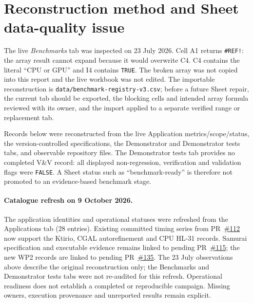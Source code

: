 \section{Reconstruction method and Sheet data-quality issue}
The live \emph{Benchmarks} tab was inspected on 23 July 2026.  Cell A1 returns
\texttt{\#REF!}: the array result cannot expand because it would overwrite C4.
C4 contains the literal ``CPU or GPU'' and I4 contains \texttt{TRUE}.  The broken
array was not copied into this report and the live workbook was not edited.  The
importable reconstruction is \texttt{data/benchmark-registry-v3.csv}; before a
future Sheet repair, the current tab should be exported, the blocking cells and
intended array formula reviewed with its owner, and the import applied to a
separate verified range or replacement tab.

Records below were reconstructed from the live Application metrics/scope/status,
the version-controlled specifications, the Demonstrator and Demonstrator tests
tabs, and observable repository files.  The Demonstrator tests tab provides no
completed V\&V record: all displayed non-regression, verification and validation
flags were \texttt{FALSE}.  A Sheet status such as ``benchmark-ready'' is
therefore not promoted to an evidence-based benchmark stage.

\paragraph{Catalogue refresh on 9 October 2026.}
The application identities and operational statuses were refreshed from the
Applications tab (28 entries). Existing committed timing series from PR~\href{https://github.com/numpex/exa-ma-d7.1/pull/112}{\#112}
now support the Ktirio, CGAL autorefinement and CPU HL-31 records.
Samurai specification and executable evidence remains linked to pending PR~\href{https://github.com/numpex/exa-ma-d7.1/pull/115}{\#115};
the new WP2 records are linked to pending PR~\href{https://github.com/numpex/exa-ma-d7.1/pull/135}{\#135}.
The 23 July observations above describe the original reconstruction only;
the Benchmarks and Demonstrator tests tabs were not re-audited for this refresh.
Operational readiness does not establish a completed or reproducible campaign.
Missing owners, execution provenance and unreported results remain explicit.

